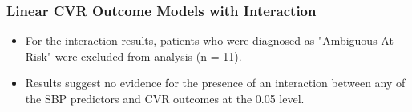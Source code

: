 \documentclass[10pt]{article}\usepackage[]{graphicx}\usepackage[]{color}
\begin{document}
\clearpage
\begin{landscape}
\subsubsection{Linear CVR Outcome Models with Interaction}

\begin{itemize}
  \item For the interaction results, patients who were diagnosed as "Ambiguous At Risk" were excluded from analysis (n = 11).
  \item Results suggest no evidence for the presence of an interaction between any of the SBP predictors and CVR outcomes at the 0.05 level.
\end{itemize}




\end{landscape}
\end{document}
